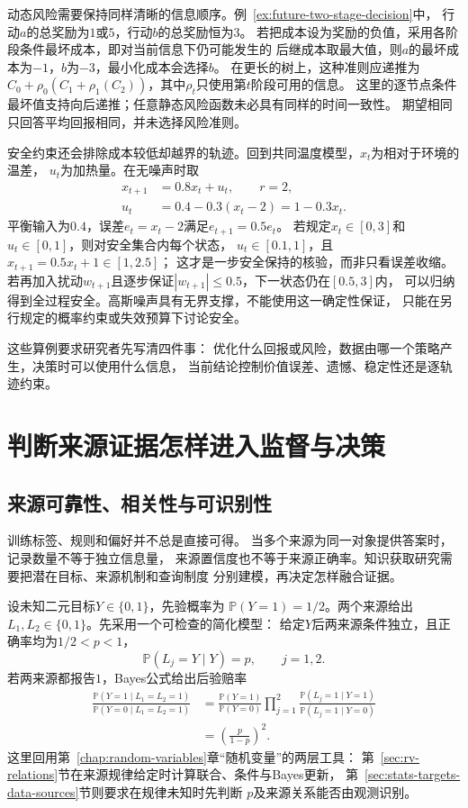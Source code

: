 动态风险需要保持同样清晰的信息顺序。例~\ref{ex:future-two-stage-decision}中，
行动$a$的总奖励为$1$或$5$，行动$b$的总奖励恒为$3$。
若把成本设为奖励的负值，采用各阶段条件最坏成本，即对当前信息下仍可能发生的
后继成本取最大值，则$a$的最坏成本为$-1$，$b$为$-3$，最小化成本会选择$b$。
在更长的树上，这种准则应递推为
$C_0+\rho_0(C_1+\rho_1(C_2))$，其中$\rho_t$只使用第$t$阶段可用的信息。
这里的逐节点条件最坏值支持向后递推；任意静态风险函数未必具有同样的时间一致性。
期望相同只回答平均回报相同，并未选择风险准则。

安全约束还会排除成本较低却越界的轨迹。回到共同温度模型，$x_t$为相对于环境的温差，
$u_t$为加热量。在无噪声时取
\begin{align*}
  x_{t+1}&=0.8x_t+u_t,\qquad r=2,\\
  u_t&=0.4-0.3(x_t-2)=1-0.3x_t.
\end{align*}
平衡输入为$0.4$，误差$e_t=x_t-2$满足$e_{t+1}=0.5e_t$。
若规定$x_t\in[0,3]$和$u_t\in[0,1]$，则对安全集合内每个状态，
$u_t\in[0.1,1]$，且$x_{t+1}=0.5x_t+1\in[1,2.5]$；
这才是一步安全保持的核验，而非只看误差收缩。
若再加入扰动$w_{t+1}$且逐步保证$|w_{t+1}|\leq0.5$，下一状态仍在$[0.5,3]$内，
可以归纳得到全过程安全。高斯噪声具有无界支撑，不能使用这一确定性保证，
只能在另行规定的概率约束或失效预算下讨论安全。

这些算例要求研究者先写清四件事：
优化什么回报或风险，数据由哪一个策略产生，决策时可以使用什么信息，
当前结论控制价值误差、遗憾、稳定性还是逐轨迹约束。

\section{判断来源证据怎样进入监督与决策}
\label{sec:future-knowledge-acquisition-fusion}

\subsection{来源可靠性、相关性与可识别性}
\label{sec:future-source-answers-reliability-identifiability}

训练标签、规则和偏好并不总是直接可得。
当多个来源为同一对象提供答案时，记录数量不等于独立信息量，
来源置信度也不等于来源正确率。知识获取研究需要把潜在目标、来源机制和查询制度
分别建模，再决定怎样融合证据。

设未知二元目标$Y\in\{0,1\}$，先验概率为
$\mathbb{P}(Y=1)=1/2$。两个来源给出
$L_1,L_2\in\{0,1\}$。先采用一个可检查的简化模型：
给定$Y$后两来源条件独立，且正确率均为$1/2<p<1$，
\[
  \mathbb{P}(L_j=Y\mid Y)=p,
  \qquad j=1,2.
\]
若两来源都报告$1$，Bayes公式给出后验赔率
\begin{align}
  \frac{
    \mathbb{P}(Y=1\mid L_1=L_2=1)
  }{
    \mathbb{P}(Y=0\mid L_1=L_2=1)
  }
  &=
  \frac{\mathbb{P}(Y=1)}{\mathbb{P}(Y=0)}
  \prod_{j=1}^{2}
  \frac{
    \mathbb{P}(L_j=1\mid Y=1)
  }{
    \mathbb{P}(L_j=1\mid Y=0)
  }
  \nonumber\\
  &=
  \left(\frac{p}{1-p}\right)^2.
  \label{eq:future-source-fusion-odds}
\end{align}
这里回用第~\ref{chap:random-variables}章“随机变量”的两层工具：
第~\ref{sec:rv-relations}节在来源规律给定时计算联合、条件与Bayes更新，
第~\ref{sec:stats-targets-data-sources}节则要求在规律未知时先判断
$p$及来源关系能否由观测识别。

